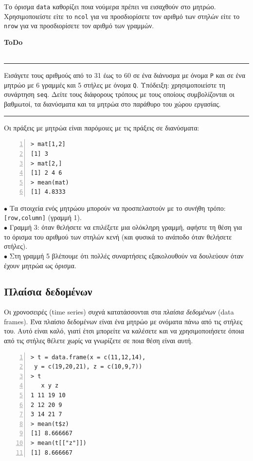 \documentclass[a4paper,10pt,twocolumn]{article}
\newenvironment{ToDo} {
  \begin{flushright}
    \hfill
    \begin{minipage}{0.9\columnwidth}
    \textsf{\textbf{ToDo}} \\
      \vspace{-0.7cm}\\
      {\color{Gray}\rule[-0.05cm]{\columnwidth}{1.5pt}}} {
      {\color{Gray}\rule[0.3cm]{\columnwidth}{1.5pt}}
    \end{minipage}
    \vspace{0.3cm}
  \end{flushright}
  }
\begin{document}
Το όρισμα \texttt{data} καθορίζει ποια νούμερα πρέπει να εισαχθούν στο μητρώο. Χρησιμοποιείστε είτε το 
\texttt{ncol} για να προσδιορίσετε τον αριθμό των στηλών είτε το \texttt{nrow} για να προσδιορίσετε τον
αριθμό των γραμμών. 

\begin{ToDo}
Εισάγετε τους αριθμούς από το 31 έως το 60 σε ένα διάνυσμα με όνομα \texttt{P} και σε ένα μητρώο με 6 γραμμές
και 5 στήλες με όνομα \texttt{Q}. Υπόδειξη: χρησιμοποιείστε τη συνάρτηση \texttt{seq}. Δείτε τους διάφορους
τρόπους με τους οποίους συμβολίζονται οι βαθμωτοί, τα διανύσματα και τα μητρώα στο παράθυρο του χώρου 
εργασίας.\\
\end{ToDo}
 
Οι πράξεις με μητρώα είναι παρόμοιες με τις πράξεις σε διανύσματα:

\begin{Verbatim}[frame=single,numbers=left,gobble=0, xleftmargin=0.35cm, numbersep=0.1cm]
> mat[1,2]
[1] 3
> mat[2,]
[1] 2 4 6
> mean(mat)
[1] 4.8333
\end{Verbatim}

\noindent $\bullet$ Τα στοιχεία ενός μητρώου μπορούν να προσπελαστούν με το συνήθη τρόπο: \texttt{[row,column]}
(γραμμή 1). \\
\noindent $\bullet$ Γραμμή 3: όταν θελήσετε να επιλέξετε μια ολόκληρη γραμμή, αφήστε τη θέση για το όρισμα του
αριθμού των στηλών κενή (και φυσικά το ανάποδο όταν θελήσετε στήλες).\\
\noindent $\bullet$ Στη γραμμή 5 βλέπουμε ότι πολλές συναρτήσεις εξακολουθούν να δουλεύουν όταν έχουν μητρώα
ως όρισμα.\\

\subsection{Πλαίσια δεδομένων}

Οι χρονοσειρές (time series) συχνά κατατάσσονται στα \emph{πλαίσια δεδομένων} (data frames). Ένα πλαίσιο
δεδομένων είναι ένα μητρώο με ονόματα πάνω από τις στήλες του. Αυτό είναι καλό, γιατί έτσι μπορείτε να καλέσετε
και να χρησιμοποιήσετε όποια από τις στήλες θέλετε χωρίς να γνωρίζετε σε ποια θέση είναι αυτή.
\begin{Verbatim}[frame=single,numbers=left,gobble=0, xleftmargin=0.35cm, numbersep=0.1cm]
> t = data.frame(x = c(11,12,14),
 y = c(19,20,21), z = c(10,9,7))
> t
   x y z
1 11 19 10
2 12 20 9 
3 14 21 7  
> mean(t$z)
[1] 8.666667
> mean(t[["z"]])
[1] 8.666667
\end{Verbatim}
\end{document}

